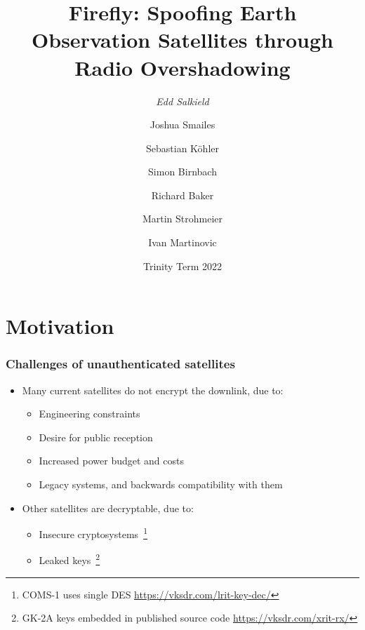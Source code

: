 \documentclass{beamer}
\begin{document}
\title[Spoofing Earth Observation Satellites through Radio Overshadowing]{Firefly: Spoofing Earth Observation Satellites through Radio Overshadowing}
\author[Edd Salkield]{
  \emph{Edd Salkield}
  \and
  Joshua Smailes
  \and
  Sebastian Köhler
  \and
  Simon Birnbach
  \and
  Richard Baker
  \and
  Martin Strohmeier
  \and
  Ivan Martinovic
}
\date{Trinity Term 2022}

\makeoxfordtitle

\section{Motivation}

\begin{frame}
  \frametitle[Challenges]{Challenges of unauthenticated satellites}
  \begin{itemize}
    \item Many current satellites do not encrypt the downlink, due to:
    \begin{itemize}
      \item Engineering constraints
      \item Desire for public reception
      \item Increased power budget and costs
      \item Legacy systems, and backwards compatibility with them
    \end{itemize}
    \item Other satellites are decryptable, due to:
    \begin{itemize}
      \item Insecure cryptosystems~\footnote{COMS-1 uses single DES \url{https://vksdr.com/lrit-key-dec/}}
      \item Leaked keys~\footnote{GK-2A keys embedded in published source code \url{https://vksdr.com/xrit-rx/}}
    \end{itemize}
  \end{itemize}
\end{frame}
\end{document}
